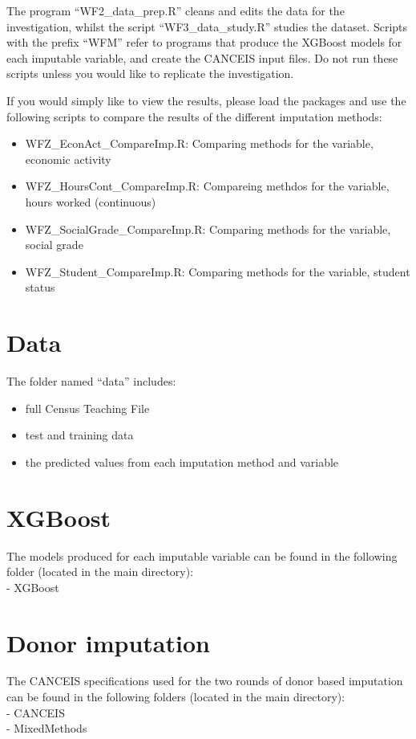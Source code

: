 \documentclass[]{book}
\providecommand{\tightlist}{%
  \setlength{\itemsep}{0pt}\setlength{\parskip}{0pt}}
\begin{document}
The program ``WF2\_data\_prep.R'' cleans and edits the data for the
investigation, whilst the script ``WF3\_data\_study.R'' studies the
dataset. Scripts with the prefix ``WFM'' refer to programs that produce
the XGBoost models for each imputable variable, and create the CANCEIS
input files. Do not run these scripts unless you would like to replicate
the investigation.

If you would simply like to view the results, please load the packages
and use the following scripts to compare the results of the different
imputation methods:

\begin{itemize}
\tightlist
\item
  WFZ\_EconAct\_CompareImp.R: Comparing methods for the variable,
  economic activity\\
\item
  WFZ\_HoursCont\_CompareImp.R: Compareing methdos for the variable,
  hours worked (continuous)\\
\item
  WFZ\_SocialGrade\_CompareImp.R: Comparing methods for the variable,
  social grade\\
\item
  WFZ\_Student\_CompareImp.R: Comparing methods for the variable,
  student status
\end{itemize}

\section{Data}\label{data}

The folder named ``data'' includes:

\begin{itemize}
\tightlist
\item
  full Census Teaching File
\item
  test and training data
\item
  the predicted values from each imputation method and variable
\end{itemize}

\section{XGBoost}\label{xgboost-1}

The models produced for each imputable variable can be found in the
following folder (located in the main directory):\\
- XGBoost

\section{Donor imputation}\label{donor-imputation}

The CANCEIS specifications used for the two rounds of donor based
imputation can be found in the following folders (located in the main
directory):\\
- CANCEIS\\
- MixedMethods


\end{document}
